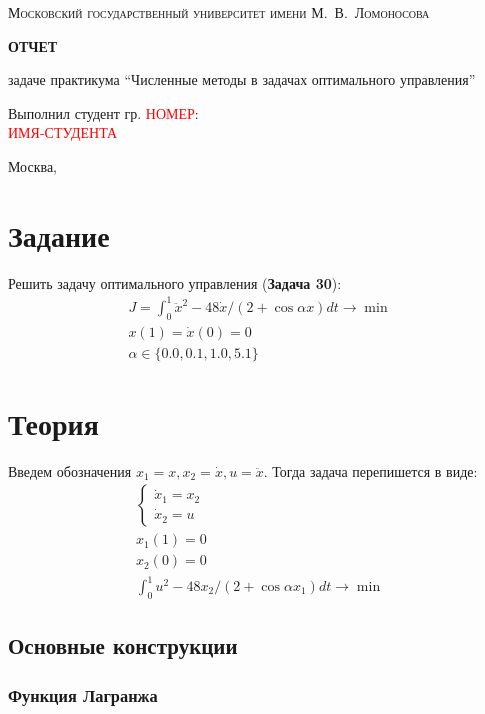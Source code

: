 \documentclass[a4paper,12pt]{article}
\newcommand{\UpdateMe}[1]{\textcolor{red}{#1}}
\newcommand{\University}{Московский государственный университет имени М.~В.~Ломоносова}
\newcommand{\Department}{Кафедра \UpdateMe{НАЗВАНИЕ-КАФЕДРЫ}}
\newcommand{\Student}{\UpdateMe{ИМЯ-СТУДЕНТА}}
\newcommand{\GroupNum}{\UpdateMe{НОМЕР}}
\newcommand{\Seminar}{Численные методы в задачах оптимального управления}
\begin{document}
\begin{titlepage}
    \centering
    {\scshape\Large \University\par}\vspace{1cm}{\scshape\large \Department\par}
    \vfill
    {\huge\bfseries ОТЧЕТ\par}{ задаче практикума \enquote{\Seminar}\par}
    \vfill
    \hfill\begin{minipage}{0.45\linewidth}Выполнил студент гр. \GroupNum:\\\Student\end{minipage}
    \vfill
    {\large Москва, \the\year{}\par}
\end{titlepage}

\section*{Задание}
Решить задачу оптимального управления ({\bfseries Задача 30}):
\begin{gather*}
  J = \int_0^1 \ddot{x}^2-48\dot{x}/\left(2+\cos{\alpha x}\right)dt \rightarrow \min\\
  x(1)=\dot{x}(0)=0\\
  \alpha\in\{0.0, 0.1, 1.0, 5.1\}
\end{gather*}

\section*{Теория}

Введем обозначения \(x_1=x, x_2=\dot{x}, u=\ddot{x}\). Тогда задача
перепишется в виде:
\begin{gather*}
  \begin{cases}\dot{x}_1=x_2\\ \dot{x}_2=u \end{cases}\\
  x_1(1)=0\\
  x_2(0)=0\\
  \int_0^1 u^2-48x_2/\left(2+\cos{\alpha x_1}\right)dt \rightarrow \min
\end{gather*}

\subsection*{Основные конструкции}

\subsubsection*{Функция Лагранжа}
\end{document}
